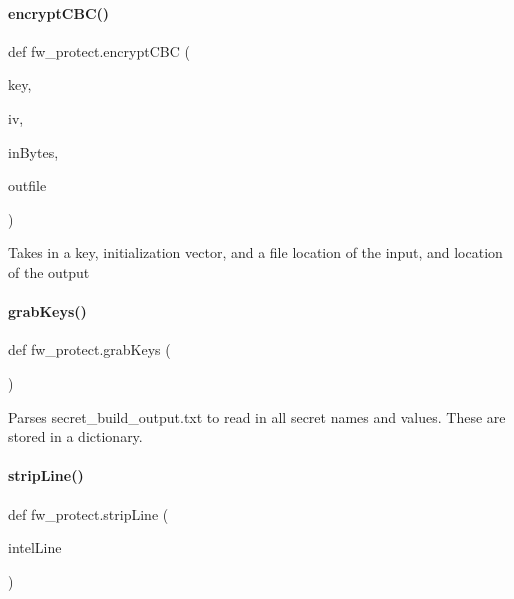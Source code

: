 \paragraph{\texorpdfstring{encrypt\+C\+B\+C()}{encryptCBC()}}
{\footnotesize\ttfamily def fw\+\_\+protect.\+encrypt\+C\+BC (\begin{DoxyParamCaption}\item[{}]{key,  }\item[{}]{iv,  }\item[{}]{in\+Bytes,  }\item[{}]{outfile }\end{DoxyParamCaption})}

\begin{DoxyVerb}Takes in a key, initialization vector, and a file location of the     input, and location of the output\end{DoxyVerb}
 \mbox{\label{namespacefw__protect_aa68fe4d7a127575d7e2402bbdb718a29}} 
\paragraph{\texorpdfstring{grab\+Keys()}{grabKeys()}}
{\footnotesize\ttfamily def fw\+\_\+protect.\+grab\+Keys (\begin{DoxyParamCaption}{ }\end{DoxyParamCaption})}

\begin{DoxyVerb}Parses secret_build_output.txt to read in all secret names and values.
These are stored in a dictionary. 
\end{DoxyVerb}
 \mbox{\label{namespacefw__protect_a3bce2fdee1937d3e624afc2055db2dbf}} 
\paragraph{\texorpdfstring{strip\+Line()}{stripLine()}}
{\footnotesize\ttfamily def fw\+\_\+protect.\+strip\+Line (\begin{DoxyParamCaption}\item[{}]{intel\+Line }\end{DoxyParamCaption})}



